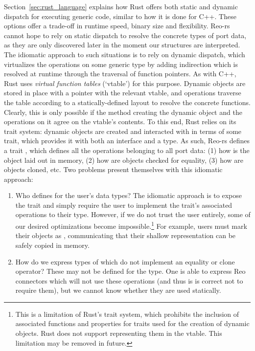 Section~\ref{sec:rust_language} explains how Rust offers both static and dynamic dispatch for executing generic code, similar to how it is done for C++. These options offer a trade-off in runtime speed, binary size and flexibility. Reo-rs cannot hope to rely on static dispatch to resolve the concrete types of port data, as they are only discovered later in the moment our  structures are interpreted. The idiomatic approach to such situations is to rely on dynamic dispatch, which virtualizes the operations on some generic type by adding indirection which is resolved at runtime through the traversal of function pointers. As with C++, Rust uses \textit{virtual function tables} (`vtable') for this purpose. Dynamic objects are stored in place with a pointer with the relevant vtable, and operations traverse the table according to a statically-defined layout to resolve the concrete functions. Clearly, this is only possible if the method creating the dynamic object and the operations on it agree on the vtable's contents. To this end, Rust relies on its trait system: dynamic objects are created and interacted with in terms of some trait, which provides it with both an interface and a type. As such, Reo-rs defines a trait , which defines all the operations belonging to all port data: (1) how is the object laid out in memory, (2) how are objects checked for equality, (3) how are objects cloned, etc. Two problems present themselves with this idiomatic approach:
\begin{enumerate}
	\item Who defines  for the user's data types? The idiomatic approach is to expose the trait and simply require the user to implement the trait's associated operations to their type. However, if we do not trust the user entirely, some of our desired optimizations become impossible.\footnote{This is a limitation of Rust's trait system, which prohibits the inclusion of associated functions and properties for traits used for the creation of dynamic objects. Rust does not support representing them in the vtable. This limitation may be removed in future.} For example, users must mark their objects as , communicating that their shallow representation can be safely copied in memory. 
	
	\item How do we express types of  which do not implement an equality or clone operator? These may not be defined for the type. One is able to express Reo connectors which will not use these operations (and thus is is correct not to require them), but we cannot know whether they are used statically.
\end{enumerate}


